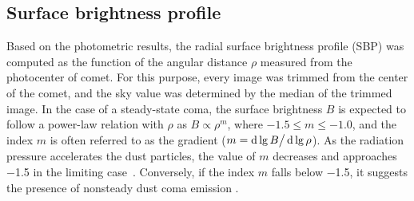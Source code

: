 

\subsection{Surface brightness profile}

Based on the photometric results, the radial surface brightness profile (SBP) was computed as the function of the angular distance $\rho$ measured from the photocenter of comet. For this purpose, every image was trimmed from the center of the comet, and the sky value was determined by the median of the trimmed image. 
In the case of a steady-state coma, the surface brightness $B$ is expected to follow a power-law relation with $\rho$ as $B \propto \rho^m$, where $-1.5 \leqslant m \leqslant -1.0$, and the index $m$ is often referred to as the gradient ($m=\mathop{}\!\mathrm{d}\lg{B} \big/ \mathop{}\!\mathrm{d}\lg{\rho}$). As the radiation pressure accelerates the dust particles, the value of $m$ decreases and approaches \si{\num{-1.5}} in the limiting case~\citep{jewitt_surface_1987}. Conversely, if the index $m$ falls below \si{\num{-1.5}}, it suggests the presence of nonsteady dust coma emission \citep{lowry_ccd_1999}.

